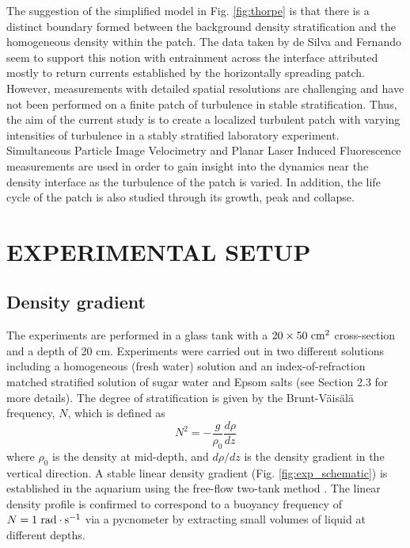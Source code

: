 \documentclass{piv13-abstract}
\newcommand{\unit}[1]{\ensuremath{\, \mathrm{\hspace{0.5mm}#1}}}
\newcommand{\figLabel}{Fig. }
\begin{document}
The suggestion of the simplified model in \figLabel\ref{fig:thorpe} is that there is a distinct boundary formed between the background density stratification and the homogeneous density within the patch. The data taken by de Silva and Fernando \cite{Silva1998} seem to support this notion with entrainment across the interface attributed mostly to return currents established by the horizontally spreading patch. However, measurements with detailed spatial resolutions are challenging and have not been performed on a finite patch of turbulence in stable stratification. Thus, the aim of the current study is to create a localized turbulent patch with varying intensities of turbulence in a stably stratified laboratory experiment. Simultaneous Particle Image Velocimetry and Planar Laser Induced Fluorescence measurements are used in order to gain insight into the dynamics near the density interface as the turbulence of the patch is varied. In addition, the life cycle of the patch is also studied through its growth, peak and collapse.

\section{EXPERIMENTAL SETUP}

\subsection{Density gradient}

The experiments are performed in a glass tank with a $20\times50\unit{cm^2}$ cross-section and a depth of 20 cm.  Experiments were carried out in two different solutions including a homogeneous (fresh water) solution and an index-of-refraction matched stratified solution of sugar water and Epsom salts \cite{McDougall1979} (see Section 2.3 for more details). The degree of stratification is given by the Brunt-V\"ais\"al\"a frequency, $N$, which is defined as
%
\begin{equation}
N^2=-\frac{g}{\rho_0}\frac{d\rho}{dz}
\label{eq:frequency}
\end{equation}
%
where $\rho_0$ is the density at mid-depth, and $d\rho/dz$ is the density gradient in the vertical direction. A stable linear density gradient (\figLabel\ref{fig:exp_schematic}) is established in the aquarium using the free-flow two-tank method \cite{Economidou2009}. The linear density profile is confirmed to correspond to a buoyancy frequency of $N=1\unit{rad\cdot s^{-1}}$ via a pycnometer by extracting small volumes of liquid at different depths.
\end{document}
